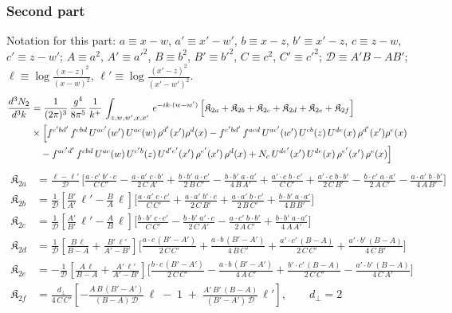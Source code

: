 \documentclass[9pt]{article}
\numberwithin{equation}{section}
\begin{document}
\subsubsection{Second part}
\noindent Notation for this part: $a\equiv x-w$, $a'\equiv x'-w'$, $b\equiv x-z$, $b'\equiv x'-z$, $c\equiv z-w$, $c'\equiv z-w'$; $A\equiv a^{2}$, $A'\equiv a'^{2}$, $B\equiv b^{2}$, $B'\equiv b'^{2}$, $C\equiv c^{2}$, $C'\equiv c'^{2}$; $\mathcal{D}\equiv A'B-AB'$; $\ell\equiv\log\frac{(x-z)^{2}}{(x-w)^{2}}$, $\ell'\equiv\log\frac{(x'-z)^{2}}{(x'-w')^{2}}$.
\begin{align}
\frac{d^{3}N_{2}}{d^{3}k} & = \frac{1}{(2\pi)^{3}}\, \frac{g^{4}}{8\pi^{5}}\,\frac{1}{k^{+}}\,\int_{z,w,w^{\prime},x,x'}\, e^{-ik\cdot(w-w^{\prime})}\,\Big[\mathfrak{K}_{2a}+\mathfrak{K}_{2b}+\mathfrak{K}_{2c}+\mathfrak{K}_{2d}+\mathfrak{K}_{2e}+\mathfrak{K}_{2f}\Big]\notag \\
& \times\Big[f^{c'bd'}\,f^{cbd}\, U^{ac'}(w')\,U^{ac}(w)\,\rho^{d'}(x')\rho^{d}(x)- f^{c'bd'}\,f^{acd}\,U^{ac'}(w')\,U^{cb}(z)\,U^{de}(x)\,\rho^{d'}(x')\rho^{e}(x) \notag \\
& \quad -f^{ac'd'}\,f^{cbd}\,U^{ac}(w)\,U^{c'b}(z)\,U^{d'e'}(x')\,\rho^{e'}(x')\,\rho^{d}(x) +N_{c}\,U^{de'}(x')\,U^{de}(x)\,\rho^{e'}(x')\,\rho^{e}(x)\Big]
\end{align}
\begin{align}
\mathfrak{K}_{2a} & =\frac{\ell-\ell'}{\mathcal{D}}\,\Bigg[\frac{a\cdot c'\;b'\cdot c}{C\,C'}-\frac{a\cdot a'\;c\cdot b'}{2\,C\,A'}+\frac{b\cdot b'\;a\cdot c'}{2\,B\,C'}-\frac{b\cdot b'\;a\cdot a'}{4\,B\,A'}
+\frac{a'\cdot c\;b\cdot c'}{C\,C'}+\frac{a'\cdot c\;b\cdot b'}{2\,C\,B'}-\frac{b\cdot c'\;a\cdot a'}{2\,A\,C'}-\frac{a\cdot a'\;b\cdot b'}{4\,A\,B'}\Bigg]\\
\mathfrak{K}_{2b} & =\frac{1}{\mathcal{D}}\left[\frac{B'}{A'}\,\ell'-\frac{B}{A}\,\ell\right]\Bigg[\frac{a\cdot a'\;c\cdot c'}{C\,C'}+\frac{a\cdot a'\;b'\cdot c}{2\,C\,B'}+\frac{a\cdot a'\;b\cdot c'}{2\,B\,C'}+\frac{b\cdot b'\;a\cdot a'}{4\,B\,B'}\Bigg]\\
\mathfrak{K}_{2c} & =\frac{1}{\mathcal{D}}\left[\frac{A'}{B'}\,\ell'-\frac{A}{B}\,\ell\right]\Bigg[\frac{b\cdot b'\;c\cdot c'}{C\,C'}-\frac{b\cdot b'\;a'\cdot c}{2\,C\,A'}-\frac{a\cdot c'\;b\cdot b'}{2\,A\,C'}+\frac{b\cdot b'\;a\cdot a'}{4\,A\,A'}\Bigg]\\
\mathfrak{K}_{2d} & =\frac{1}{\mathcal{D}}\left[\frac{B\,\ell}{B-A}+\frac{B'\,\ell'}{A'-B'}\right]\Bigg[\frac{a\cdot c\,(B'-A')}{2\,C\,C'}+\frac{a\cdot b\,(B'-A')}{4\,B\,C'}+\frac{a'\cdot c'\,(B-A)}{2\,C\,C'}+\frac{a'\cdot b'\,(B-A)}{4\,C\,B'}\Bigg]\\
\mathfrak{K}_{2e} & =-\frac{1}{\mathcal{D}}\left[\frac{A\,\ell}{B-A}+\frac{A'\,\ell'}{A'-B'}\right]\Bigg[\frac{b\cdot c\,(B'-A')}{2\,C\,C'}-\frac{a\cdot b\,(B'-A')}{4\,A\,C'}+\frac{b'\cdot c'\,(B-A)}{2\,C\,C'}-\frac{a'\cdot b'\,(B-A)}{4\,C\,A'}\Bigg]\\
\mathfrak{K}_{2f} & =\frac{d_{\perp}}{4\,C\,C'}\left[-\frac{A\,B\,(B'-A')}{(B-A)\,\mathcal{D}}\,\ell\;-\;1\;+\;\frac{A'\,B'\,(B-A)}{(B'-A')\,\mathcal{D}}\,\ell'\right],\qquad d_{\perp}=2
\end{align}
\end{document}
